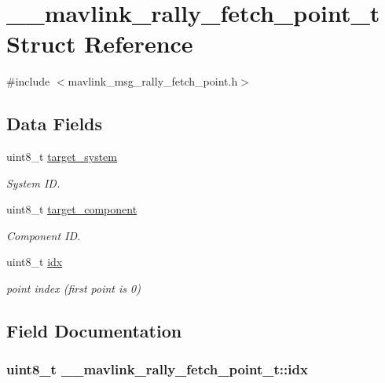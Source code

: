 \hypertarget{struct____mavlink__rally__fetch__point__t}{\section{\+\_\+\+\_\+mavlink\+\_\+rally\+\_\+fetch\+\_\+point\+\_\+t Struct Reference}
\label{struct____mavlink__rally__fetch__point__t}
}


{\ttfamily \#include $<$mavlink\+\_\+msg\+\_\+rally\+\_\+fetch\+\_\+point.\+h$>$}

\subsection*{Data Fields}
\begin{DoxyCompactItemize}
\item 
uint8\+\_\+t \hyperlink{struct____mavlink__rally__fetch__point__t_aff0edbe04a82279086868d333e57b36c}{target\+\_\+system}
\begin{DoxyCompactList}\small\item\em System I\+D. \end{DoxyCompactList}\item 
uint8\+\_\+t \hyperlink{struct____mavlink__rally__fetch__point__t_aadf1ea321c39310b8cf79ffd128f6cef}{target\+\_\+component}
\begin{DoxyCompactList}\small\item\em Component I\+D. \end{DoxyCompactList}\item 
uint8\+\_\+t \hyperlink{struct____mavlink__rally__fetch__point__t_a2e7b4a83656d5570841a7e6fffff8037}{idx}
\begin{DoxyCompactList}\small\item\em point index (first point is 0) \end{DoxyCompactList}\end{DoxyCompactItemize}


\subsection{Field Documentation}
\hypertarget{struct____mavlink__rally__fetch__point__t_a2e7b4a83656d5570841a7e6fffff8037}{
\subsubsection[{idx}]{\setlength{\rightskip}{0pt plus 5cm}uint8\+\_\+t \+\_\+\+\_\+mavlink\+\_\+rally\+\_\+fetch\+\_\+point\+\_\+t\+::idx}}\label{struct____mavlink__rally__fetch__point__t_a2e7b4a83656d5570841a7e6fffff8037}


